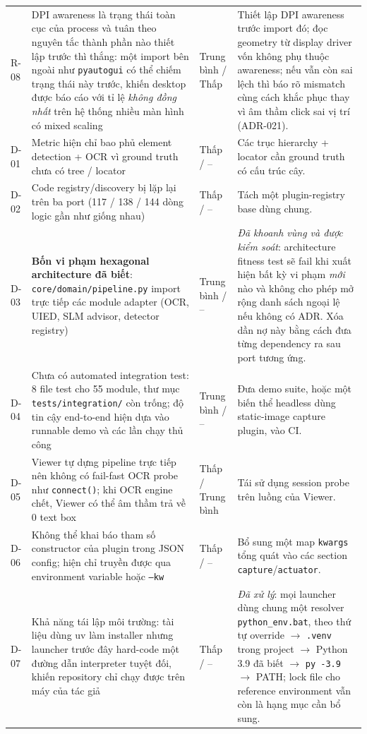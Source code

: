 \documentclass[11pt,a4paper]{report}
\newcommand{\code}[1]{\texttt{#1}}
\begin{document}
\begin{longtable}{@{}p{1.2cm}p{5.0cm}p{2.0cm}p{5.6cm}@{}}
R-08 & DPI awareness là trạng thái toàn cục của process và tuân theo nguyên tắc thành phần nào thiết lập trước thì thắng: một import bên ngoài như \code{pyautogui} có thể chiếm trạng thái này trước, khiến desktop được báo cáo với tỉ lệ \emph{không đồng nhất} trên hệ thống nhiều màn hình có mixed scaling & Trung bình / Thấp & Thiết lập DPI awareness trước import đó; đọc geometry từ display driver vốn không phụ thuộc awareness; nếu vẫn còn sai lệch thì báo rõ mismatch cùng cách khắc phục thay vì âm thầm click sai vị trí (ADR-021). \\
D-01 & Metric hiện chỉ bao phủ element detection + OCR vì ground truth chưa có tree / locator & Thấp / -- & Các trục hierarchy + locator cần ground truth có cấu trúc cây. \\
D-02 & Code registry/discovery bị lặp lại trên ba port (117 / 138 / 144 dòng logic gần như giống nhau) & Thấp / -- & Tách một plugin-registry base dùng chung. \\
D-03 & \textbf{Bốn vi phạm hexagonal architecture đã biết}: \code{core/domain/pipeline.py} import trực tiếp các module adapter (OCR, UIED, SLM advisor, detector registry) & Trung bình / -- & \emph{Đã khoanh vùng và được kiểm soát}: architecture fitness test sẽ fail khi xuất hiện bất kỳ vi phạm \emph{mới} nào và không cho phép mở rộng danh sách ngoại lệ nếu không có ADR. Xóa dần nợ này bằng cách đưa từng dependency ra sau port tương ứng. \\
D-04 & Chưa có automated integration test: 8 file test cho 55 module, thư mục \code{tests/integration/} còn trống; độ tin cậy end-to-end hiện dựa vào runnable demo và các lần chạy thủ công & Trung bình / -- & Đưa demo suite, hoặc một biến thể headless dùng static-image capture plugin, vào CI. \\
D-05 & Viewer tự dựng pipeline trực tiếp nên không có fail-fast OCR probe như \code{connect()}; khi OCR engine chết, Viewer có thể âm thầm trả về 0 text box & Thấp / Trung bình & Tái sử dụng session probe trên luồng của Viewer. \\
D-06 & Không thể khai báo tham số constructor của plugin trong JSON config; hiện chỉ truyền được qua environment variable hoặc \code{--kw} & Thấp / -- & Bổ sung một map \code{kwargs} tổng quát vào các section \code{capture}/\code{actuator}. \\
D-07 & Khả năng tái lập môi trường: tài liệu dùng uv làm installer nhưng launcher trước đây hard-code một đường dẫn interpreter tuyệt đối, khiến repository chỉ chạy được trên máy của tác giả & Thấp / -- & \emph{Đã xử lý}: mọi launcher dùng chung một resolver \code{python\_env.bat}, theo thứ tự override $\rightarrow$ \code{.venv} trong project $\rightarrow$ Python 3.9 đã biết $\rightarrow$ \code{py -3.9} $\rightarrow$ PATH; lock file cho reference environment vẫn còn là hạng mục cần bổ sung. \\
\bottomrule
\end{longtable}
\end{document}
